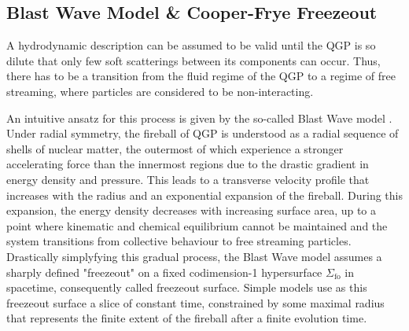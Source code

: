 \subsection{Blast Wave Model \& Cooper-Frye Freezeout}

A hydrodynamic description can be assumed to be valid until the QGP is so dilute that only few soft scatterings between its components can occur. Thus, there has to be a transition from the fluid regime of the QGP to a regime of free streaming, where particles are considered to be non-interacting.

An intuitive ansatz for this process is given by the so-called Blast Wave model \cite{SiemensRasmussen_1979,FlorkowskiBroniowski_2004,ChenEtAl_2021,JaiswalKoch_2015}. Under radial symmetry, the fireball of QGP is understood as a radial sequence of shells of nuclear matter, the outermost of which experience a stronger accelerating force than the innermost regions due to the drastic gradient in energy density and pressure. This leads to a transverse velocity profile that increases with the radius and an exponential expansion of the fireball. During this expansion, the energy density decreases with increasing surface area, up to a point where kinematic and chemical equilibrium cannot be maintained and the system transitions from collective behaviour to free streaming particles. Drastically simplyfying this gradual process, the Blast Wave model assumes a sharply defined "freezeout" on a fixed codimension-1 hypersurface $\Sigma_{\text{fo}}$ in spacetime, consequently called freezeout surface. Simple models use as this freezeout surface a slice of constant time, constrained by some maximal radius that represents the finite extent of the fireball after a finite evolution time.


